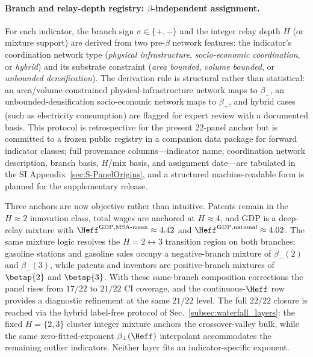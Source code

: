 \paragraph{Branch and relay-depth registry: $\beta$-independent assignment.}
For each indicator, the branch sign $\sigma\in\{+,-\}$ and the integer
relay depth $H$ (or mixture support) are derived from two pre-$\beta$
network features: the indicator's coordination network type
(\textit{physical infrastructure}, \textit{socio-economic coordination},
or \textit{hybrid}) and its substrate constraint (\textit{area bounded},
\textit{volume bounded}, or \textit{unbounded densification}).
The derivation rule is structural rather than statistical: an
area/volume-constrained physical-infrastructure network maps to
$\beta_{-}$, an unbounded-densification socio-economic network maps to
$\beta_{+}$, and hybrid cases (such as
electricity consumption) are flagged for expert review with a
documented basis. This protocol is retrospective for the present
22-panel anchor but is committed to a frozen public registry in a
companion data package for forward indicator classes; full provenance
columns---indicator name, coordination network description, branch
basis, $H$/mix basis, and assignment date---are tabulated in the SI
Appendix~\ref{sec:S-PanelOrigins}, and a structured machine-readable
form is planned for the supplementary release.

Three anchors are now objective rather than intuitive. Patents remain in the
$H\approx 2$ innovation class, total wages are anchored at $H\approx 4$,
and GDP is a deep-relay mixture with
$\Heff^{\mathrm{GDP,MSA\text{-}mean}}\approx 4.42$ and
$\Heff^{\mathrm{GDP,national}}\approx 4.02$. The same mixture logic resolves
the $H=2\leftrightarrow 3$ transition region on both branches: gasoline
stations and gasoline sales occupy a negative-branch mixture of
$\beta_{-}(2)$ and $\beta_{-}(3)$, while patents and inventors are
positive-branch mixtures of $\betap{2}$ and $\betap{3}$. With these
same-branch composition corrections the panel rises from $17/22$ to
$21/22$ CI coverage, and the continuous-$\Heff$ row provides a
diagnostic refinement at the same $21/22$ level.  The full $22/22$
closure is reached via the hybrid label-free protocol of
Sec.~\ref{subsec:waterfall_layers}: the fixed $H{=}\{2,3\}$ cluster
integer mixture anchors the crossover-valley bulk, while the same
zero-fitted-exponent $\beta_{\pm}(\Heff)$ interpolant accommodates the
remaining outlier indicators. Neither layer fits an indicator-specific
exponent.

